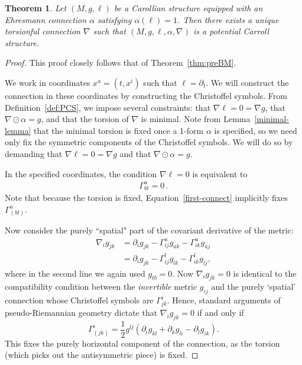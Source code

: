 \documentclass{article}
\newtheorem{theorem}{Theorem}[section]
\theoremstyle{definition}
\theoremstyle{remark}
\begin{document}
\begin{theorem}
Let $(M,g,\ell)$ be a Carollian structure equipped with an Ehresmann connection $\alpha$ satisfying $\alpha(\ell) = 1$. Then there exists a unique torsionful connection $\nabla$ such that $(M,g,\ell,\alpha,\nabla)$ is a potential Carroll structure.
\end{theorem}
\begin{proof}
This proof closely follows that of Theorem~\ref{thm:preBM}.

We work in coordinates $x^a = (t,x^i)$ such that $\ell = \partial_t$. We will construct the connection in these coordinates by constructing the Christoffel symbols. From Definition~\ref{def:PCS}, we impose several constraints: that $\nabla \ell = 0 = \nabla g$, that $\nabla \odot \alpha = g$, and that the torsion of $\nabla$ is minimal. Note from Lemma~\ref{minimal-lemma} that the minimal torsion is fixed once a 1-form $\alpha$ is specified, so we need only fix the symmetric components of the Christoffel symbols. We will do so by demanding that $\nabla \ell = 0 = \nabla g$ and that $\nabla \odot \alpha = g$.

In the specified coordinates, the condition $\nabla \ell = 0$ is equivalent to \begin{align} \label{first-connect}
    \Gamma^a_{bt} = 0\,.
\end{align}
Note that because the torsion is fixed, Equation~\ref{first-connect} implicitly fixes $\Gamma^a_{(bt)}$.

Now consider the purely ``spatial" part of the covariant derivative of the metric:
\begin{align*} \nabla_{i}g_{jk} & = \partial_i g_{jk} - \Gamma^a_{ij}g_{ak} - \Gamma^a_{ik}g_{aj} \\
&= \partial_i g_{jk} - \Gamma^l_{ij}g_{lk} - \Gamma^l_{ik}g_{lj},
\end{align*}
where in the second line we again used $g_{tb} = 0$. Now $\nabla_i g_{jk} = 0$ is identical to the compatibility condition between the \emph{invertible} metric $g_{ij}$ and the purely `spatial' connection whose Christoffel symbols are $\Gamma^i_{jk}$. Hence, standard arguments of pseudo-Riemannian geometry dictate that $\nabla_i g_{jk} = 0$ if and only if
\begin{equation} \label{Levi-Civita}
\Gamma^i_{(jk)} = \frac{1}{2}g^{lj}(\partial_i g_{kl} + \partial_k g_{li} - \partial_l g_{ik}).
\end{equation}
This fixes the purely horizontal component of the connection, as the torsion (which picks out the antisymmetric piece) is fixed.


\end{proof}
\end{document}
